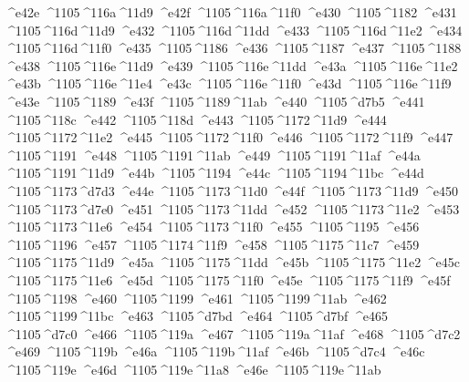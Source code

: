 \checkit ^^^^e42e ^^^^1105^^^^116a^^^^11d9
\checkit ^^^^e42f ^^^^1105^^^^116a^^^^11f0
\checkit ^^^^e430 ^^^^1105^^^^1182
\checkit ^^^^e431 ^^^^1105^^^^116d^^^^11d9
\checkit ^^^^e432 ^^^^1105^^^^116d^^^^11dd
\checkit ^^^^e433 ^^^^1105^^^^116d^^^^11e2
\checkit ^^^^e434 ^^^^1105^^^^116d^^^^11f0
\checkit ^^^^e435 ^^^^1105^^^^1186
\checkit ^^^^e436 ^^^^1105^^^^1187
\checkit ^^^^e437 ^^^^1105^^^^1188
\checkit ^^^^e438 ^^^^1105^^^^116e^^^^11d9
\checkit ^^^^e439 ^^^^1105^^^^116e^^^^11dd
\checkit ^^^^e43a ^^^^1105^^^^116e^^^^11e2
\checkit ^^^^e43b ^^^^1105^^^^116e^^^^11e4
\checkit ^^^^e43c ^^^^1105^^^^116e^^^^11f0
\checkit ^^^^e43d ^^^^1105^^^^116e^^^^11f9
\checkit ^^^^e43e ^^^^1105^^^^1189
\checkit ^^^^e43f ^^^^1105^^^^1189^^^^11ab
\checkit ^^^^e440 ^^^^1105^^^^d7b5
\checkit ^^^^e441 ^^^^1105^^^^118c
\checkit ^^^^e442 ^^^^1105^^^^118d
\checkit ^^^^e443 ^^^^1105^^^^1172^^^^11d9
\checkit ^^^^e444 ^^^^1105^^^^1172^^^^11e2
\checkit ^^^^e445 ^^^^1105^^^^1172^^^^11f0
\checkit ^^^^e446 ^^^^1105^^^^1172^^^^11f9
\checkit ^^^^e447 ^^^^1105^^^^1191
\checkit ^^^^e448 ^^^^1105^^^^1191^^^^11ab
\checkit ^^^^e449 ^^^^1105^^^^1191^^^^11af
\checkit ^^^^e44a ^^^^1105^^^^1191^^^^11d9
\checkit ^^^^e44b ^^^^1105^^^^1194
\checkit ^^^^e44c ^^^^1105^^^^1194^^^^11bc
\checkit ^^^^e44d ^^^^1105^^^^1173^^^^d7d3
\checkit ^^^^e44e ^^^^1105^^^^1173^^^^11d0
\checkit ^^^^e44f ^^^^1105^^^^1173^^^^11d9
\checkit ^^^^e450 ^^^^1105^^^^1173^^^^d7e0
\checkit ^^^^e451 ^^^^1105^^^^1173^^^^11dd
\checkit ^^^^e452 ^^^^1105^^^^1173^^^^11e2
\checkit ^^^^e453 ^^^^1105^^^^1173^^^^11e6
\checkit ^^^^e454 ^^^^1105^^^^1173^^^^11f0
\checkit ^^^^e455 ^^^^1105^^^^1195
\checkit ^^^^e456 ^^^^1105^^^^1196
\checkit ^^^^e457 ^^^^1105^^^^1174^^^^11f9
\checkit ^^^^e458 ^^^^1105^^^^1175^^^^11c7
\checkit ^^^^e459 ^^^^1105^^^^1175^^^^11d9
\checkit ^^^^e45a ^^^^1105^^^^1175^^^^11dd
\checkit ^^^^e45b ^^^^1105^^^^1175^^^^11e2
\checkit ^^^^e45c ^^^^1105^^^^1175^^^^11e6
\checkit ^^^^e45d ^^^^1105^^^^1175^^^^11f0
\checkit ^^^^e45e ^^^^1105^^^^1175^^^^11f9
\checkit ^^^^e45f ^^^^1105^^^^1198
\checkit ^^^^e460 ^^^^1105^^^^1199
\checkit ^^^^e461 ^^^^1105^^^^1199^^^^11ab
\checkit ^^^^e462 ^^^^1105^^^^1199^^^^11bc
\checkit ^^^^e463 ^^^^1105^^^^d7bd
\checkit ^^^^e464 ^^^^1105^^^^d7bf
\checkit ^^^^e465 ^^^^1105^^^^d7c0
\checkit ^^^^e466 ^^^^1105^^^^119a
\checkit ^^^^e467 ^^^^1105^^^^119a^^^^11af
\checkit ^^^^e468 ^^^^1105^^^^d7c2
\checkit ^^^^e469 ^^^^1105^^^^119b
\checkit ^^^^e46a ^^^^1105^^^^119b^^^^11af
\checkit ^^^^e46b ^^^^1105^^^^d7c4
\checkit ^^^^e46c ^^^^1105^^^^119e
\checkit ^^^^e46d ^^^^1105^^^^119e^^^^11a8
\checkit ^^^^e46e ^^^^1105^^^^119e^^^^11ab
